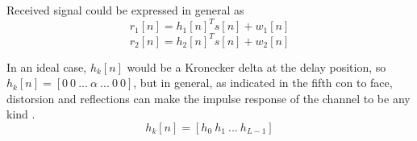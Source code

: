   Received signal could be expressed in general as
  $$ r_1[n] = h_1[n]^T s[n] + w_1[n] $$
  $$ r_2[n] = h_2[n]^T s[n] + w_2[n] $$
  
  In an ideal case, $h_k[n]$ would be a Kronecker delta at the delay position, so $h_k[n] = [0\ 0\ ...\ \alpha\ ...\ 0\ 0]$, but in general, as indicated in the fifth con to face, distorsion and reflections can make the impulse response of the channel to be any kind \cite{overview}.
  $$ h_k[n] = [h_0\ h_1\ ...\ h_{L-1}] $$
  
